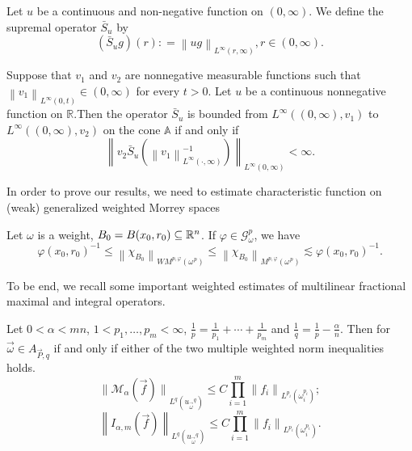\documentclass[11pt, twoside, leqno]{article}
\begin{document}
Let $u$ be a continuous and non-negative function on $(0,\infty)$. We define the supremal operator ${{\bar S}_u}$ by
$$({{\bar S}_u}g)(r): = {\left\| {ug} \right\|_{{L^\infty }(r,\infty )}}, r \in (0,\infty ).$$

\begin{lem}[\cite{Gu8}]\label{Gu8}
	Suppose that $v_1$ and $v_2$ are nonnegative measurable functions such that ${\left\| {{v_1}} \right\|_{{L^\infty }(0,t)}} \in (0,\infty )$ for every $t>0$. Let $u$ be a continuous nonnegative function on $\mathbb{R}$.Then the operator ${{\bar S}_u}$ is bounded from ${L^\infty }((0,\infty ),{v_1})$ to ${L^\infty }((0,\infty ),{v_2})$ on the cone $\mathbb{A}$ if and only if
	\begin{equation}\label{Gu81}
	{\left\| {{v_2}{{\bar S}_u}(\left\| {{v_1}} \right\|_{{L^\infty }( \cdot ,\infty )}^{ - 1})} \right\|_{{L^\infty }(0,\infty )}} < \infty.
	\end{equation}
\end{lem}

In order to prove our results, we need to estimate characteristic function on (weak) generalized weighted Morrey spaces
\begin{lem}[\cite{Gu7}]\label{Gu7}
	Let $\omega$ is a weight, ${B_0} = B({x_0},{r_0}) \subseteq {\mathbb R^n}$. If $\varphi \in \mathcal{G}_\omega ^p$, we have
	\begin{equation*}
	\varphi {({x_0},{r_0})^{ - 1}} \le {\left\| {{\chi _{{B_0}}}} \right\|_{W{M^{p,\varphi }}\left( {{\omega _{}}^p} \right)}} \le {\left\| {{\chi _{{B_0}}}} \right\|_{{M^{p,\varphi }}\left( {{\omega _{}}^p} \right)}} \lesssim \varphi {({x_0},{r_0})^{ - 1}}.
	\end{equation*}
\end{lem}

To be end, we recall some important weighted estimates of multilinear fractional maximal and integral operators.
\begin{lem}\label{LB1}
	Let $0 < \alpha < mn$, $1 < p_1, \ldots, p_m < \infty$,
	$\frac{1}{p} = \frac{1}{p_1} + \cdots + \frac{1}{p_m}$ and
	$\frac{1}{q} = \frac{1}{p} - \frac{\alpha}{n}$. Then for
	$\vec{\omega}\in A_{\vec{P}, q}$ if and only if either of the two multiple weighted norm inequalities holds.
	\begin{equation}
	{\big\|\mathcal{M}_{\alpha}(\vec{f})\big\|}_{L^{q}({u_{\vec{\omega}}}^{q})} \le C \prod_{i=1}^m{\big\|f_i\big\|}_{L^{p_i}(\omega_i^{p_i})};
	\end{equation}
	\begin{equation}
	{\left\|I_{\alpha,m}(\vec{f})\right\|}_{L^{q}({u_{\vec{\omega}}}^{q})} \le C \prod_{i =1}^m{\big\|f_i\big\|}_{L^{p_i}(\omega_i^{p_i})}.
	\end{equation}
\end{lem}
\end{document}
